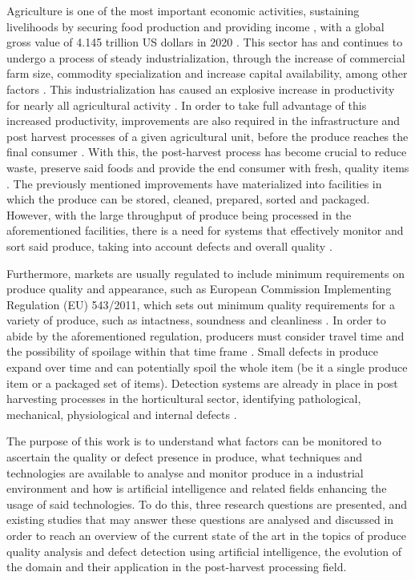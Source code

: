 \documentclass[conference]{IEEEtran}
\begin{document}
Agriculture is one of the most important economic activities, sustaining livelihoods by securing food production and providing income \cite{FDES-1}, with a global gross value of 4.145 trillion US dollars in 2020 \cite{FAO1}. This sector has and continues to undergo a process of steady industrialization, through the increase of commercial farm size, commodity specialization and increase capital availability, among other factors \cite{10.2307/1243439}. This industrialization has caused an explosive increase in productivity for nearly all agricultural activity \cite{owidagriculturalproduction}. In order to take full advantage of this increased productivity, improvements are also required in the infrastructure and post harvest processes of a given agricultural unit, before the produce reaches the final consumer \cite{Food_and_Agriculture_Organization_of_the_United_Nations2010-hb}. With this, the post-harvest process has become crucial to reduce waste, preserve said foods and provide the end consumer with fresh, quality items \cite{foods6010008}. The previously mentioned improvements have materialized into facilities in which the produce can be stored, cleaned, prepared, sorted and packaged. However, with the large throughput of produce being processed in the aforementioned facilities, there is a need for systems that effectively monitor and sort said produce, taking into account defects and overall quality \cite{Mahalik2009}.

Furthermore, markets are usually regulated to include minimum requirements on produce quality and appearance, such as European Commission Implementing Regulation (EU) 543/2011, which sets out minimum quality requirements for a variety of produce, such as intactness, soundness and cleanliness \cite{eu-5432011}. In order to abide by the aforementioned regulation, producers must consider travel time and the possibility of spoilage within that time frame \cite{biv081}. Small defects in produce expand over time and can potentially spoil the whole item (be it a single produce item or a packaged set of items). Detection systems are already in place in post harvesting processes in the horticultural sector, identifying pathological, mechanical, physiological and internal defects \cite{Nturambirwe2020}.

The purpose of this work is to understand what factors can be monitored to ascertain the quality or defect presence in produce, what techniques and technologies are available to analyse and monitor produce in a industrial environment and how is artificial intelligence and related fields enhancing the usage of said technologies. To do this, three research questions are presented, and existing studies that may answer these questions are analysed and discussed in order to reach an overview of the current state of the art in the topics of produce quality analysis and defect detection using artificial intelligence, the evolution of the domain and their application in the post-harvest processing field.
\end{document}
